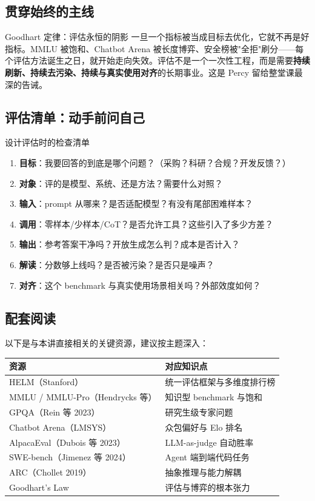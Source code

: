 \documentclass[a4paper]{article}
\begin{document}
\subsection{贯穿始终的主线}

\begin{knowledgebox}{Goodhart 定律：评估永恒的阴影}
一旦一个指标被当成目标去优化，它就不再是好指标。MMLU 被饱和、Chatbot Arena 被长度博弈、安全榜被"全拒"刷分——每个评估方法诞生之日，就开始走向失效。评估不是一个一次性工程，而是需要\textbf{持续刷新、持续去污染、持续与真实使用对齐}的长期事业。这是 Percy 留给整堂课最深的告诫。
\end{knowledgebox}

\subsection{评估清单：动手前问自己}

\begin{practicebox}{设计评估时的检查清单}
\begin{enumerate}
\item \textbf{目标}：我要回答的到底是哪个问题？（采购？科研？合规？开发反馈？）
\item \textbf{对象}：评的是模型、系统、还是方法？需要什么对照？
\item \textbf{输入}：prompt 从哪来？是否适配模型？有没有尾部困难样本？
\item \textbf{调用}：零样本/少样本/CoT？是否允许工具？这些引入了多少方差？
\item \textbf{输出}：参考答案干净吗？开放生成怎么判？成本是否计入？
\item \textbf{解读}：分数够上线吗？是否被污染？是否只是噪声？
\item \textbf{对齐}：这个 benchmark 与真实使用场景相关吗？外部效度如何？
\end{enumerate}
\end{practicebox}

\subsection{配套阅读}

以下是与本讲直接相关的关键资源，建议按主题深入：

\begin{tabular}{p{7cm}p{6cm}}
\toprule
\textbf{资源} & \textbf{对应知识点} \\
\midrule
HELM（Stanford） & 统一评估框架与多维度排行榜 \\
MMLU / MMLU-Pro（Hendrycks 等） & 知识型 benchmark 与饱和 \\
GPQA（Rein 等 2023） & 研究生级专家问题 \\
Chatbot Arena（LMSYS） & 众包偏好与 Elo 排名 \\
AlpacaEval（Dubois 等 2023） & LLM-as-judge 自动胜率 \\
SWE-bench（Jimenez 等 2024） & Agent 端到端代码任务 \\
ARC（Chollet 2019） & 抽象推理与能力解耦 \\
Goodhart's Law & 评估与博弈的根本张力 \\
\bottomrule
\end{tabular}

\end{document}

